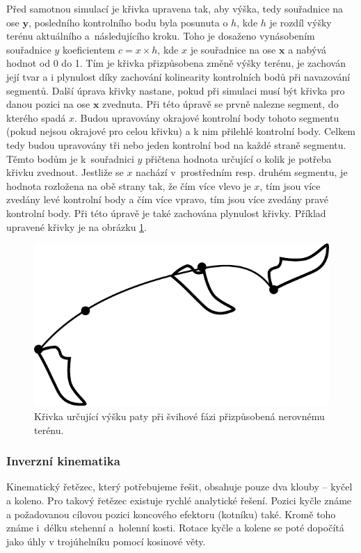 Před samotnou simulací je křivka upravena tak, aby výška, tedy souřadnice na ose $\mathbf{y}$, posledního kontrolního bodu byla posunuta o $h$, kde $h$ je rozdíl výšky terénu aktuálního a~následujícího kroku. Toho je dosaženo vynásobením souřadnice $y$ koeficientem $c = x \times h$, kde $x$ je souřadnice na ose $\mathbf{x}$ a nabývá hodnot od 0 do 1. Tím je křivka přizpůsobena změně výšky terénu, je zachován její tvar a i plynulost díky zachování kolinearity kontrolních bodů při navazování segmentů. Další úprava křivky nastane, pokud při simulaci musí být křivka pro danou pozici na ose $\mathbf{x}$ zvednuta. Při této úpravě se prvně nalezne segment, do kterého spadá $x$. Budou upravovány okrajové kontrolní body tohoto segmentu (pokud nejsou okrajové pro celou křivku) a k nim přilehlé kontrolní body. Celkem tedy budou upravovány tři nebo jeden kontrolní bod na každé straně segmentu. Těmto bodům je k~souřadnici $y$ přičtena hodnota určující o kolik je potřeba křivku zvednout. Jestliže se $x$ nachází v~prostředním resp. druhém segmentu, je hodnota rozložena na obě strany tak, že čím více vlevo je $x$, tím jsou více zvedány levé kontrolní body a čím více vpravo, tím jsou více zvedány pravé kontrolní body. Při této úpravě je také zachována plynulost křivky. Příklad upravené křivky je na obrázku \ref{fig:swingHeightAdjusted}.

\begin{figure}[h]
	\centering
	\includegraphics[width=0.4\linewidth]{fig/swingHeightAdjusted.pdf}
	\caption{Křivka určující výšku paty při švihové fázi přizpůsobená nerovnému terénu.}
	\label{fig:swingHeightAdjusted}
\end{figure}

\subsubsection{Inverzní kinematika}
Kinematický řetězec, který potřebujeme řešit, obsahuje pouze dva klouby -- kyčel a koleno. Pro takový řetězec existuje rychlé analytické řešení. Pozici kyčle známe a požadovanou cílovou pozici koncového efektoru (kotníku) také. Kromě toho známe i~délku stehenní a~holenní kosti. Rotace kyčle a kolene se poté dopočítá jako úhly v trojúhelníku pomocí kosinové věty.

